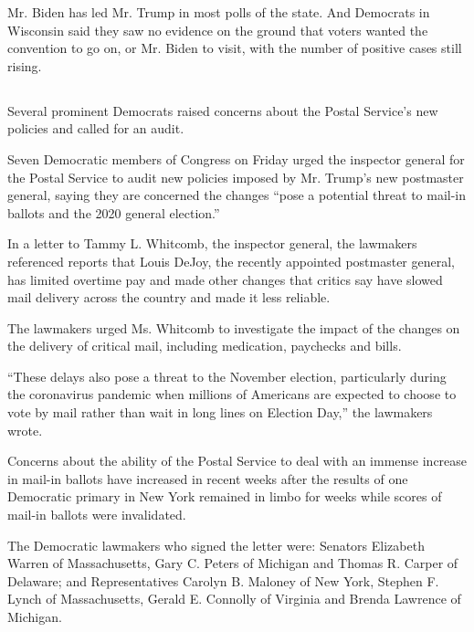 Mr. Biden has led Mr. Trump in most polls of the state. And Democrats in
Wisconsin said they saw no evidence on the ground that voters wanted the
convention to go on, or Mr. Biden to visit, with the number of positive
cases still rising.

\hypertarget{section-4}{%
\subsection{}\label{section-4}}

Several prominent Democrats raised concerns about the Postal Service's
new policies and called for an audit.

Seven Democratic members of Congress on Friday urged the inspector
general for the Postal Service to audit new policies imposed by Mr.
Trump's new postmaster general, saying they are concerned the changes
``pose a potential threat to mail-in ballots and the 2020 general
election.''

In a letter to Tammy L. Whitcomb, the inspector general, the lawmakers
referenced reports that Louis DeJoy, the recently appointed postmaster
general, has limited overtime pay and made other changes that critics
say have slowed mail delivery across the country and made it less
reliable.

The lawmakers urged Ms. Whitcomb to investigate the impact of the
changes on the delivery of critical mail, including medication,
paychecks and bills.

``These delays also pose a threat to the November election, particularly
during the coronavirus pandemic when millions of Americans are expected
to choose to vote by mail rather than wait in long lines on Election
Day,'' the lawmakers wrote.

Concerns about the ability of the Postal Service to deal with an immense
increase in mail-in ballots have increased in recent weeks after the
results of one Democratic primary in New York remained in limbo for
weeks while scores of mail-in ballots were invalidated.

The Democratic lawmakers who signed the letter were: Senators Elizabeth
Warren of Massachusetts, Gary C. Peters of Michigan and Thomas R. Carper
of Delaware; and Representatives Carolyn B. Maloney of New York, Stephen
F. Lynch of Massachusetts, Gerald E. Connolly of Virginia and Brenda
Lawrence of Michigan.

\hypertarget{section-5}{%
\subsection{}\label{section-5}}

